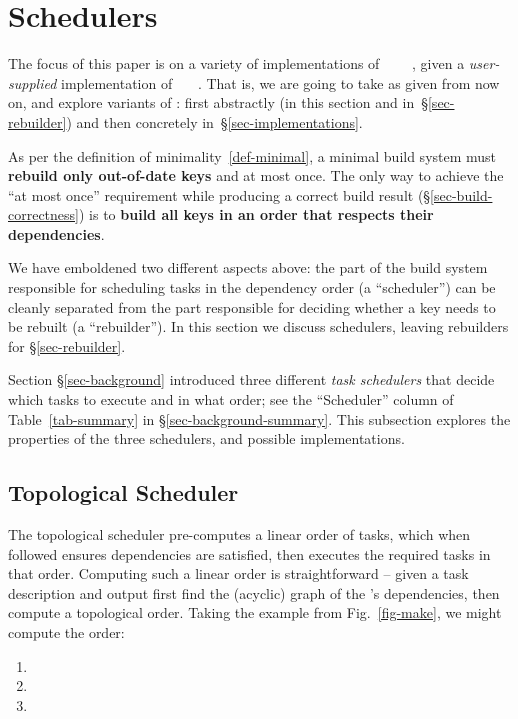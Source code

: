 \section{Schedulers}\label{sec-scheduler}

The focus of this paper is on a variety of implementations of
~~~~, given a \emph{user-supplied}
implementation of ~~~. That is, we are going to take
 as given from now on, and explore variants of : first
abstractly (in this section and in~\S\ref{sec-rebuilder}) and then concretely
in~\S\ref{sec-implementations}.

As per the definition of minimality~\ref{def-minimal}, a minimal build
system must \textbf{rebuild only out-of-date keys} and at most once. The only
way to achieve the ``at most once'' requirement while producing a correct build
result (\S\ref{sec-build-correctness}) is to \textbf{build all keys in an
order that respects their dependencies}.

We have emboldened two different aspects above: the part of the build system
responsible for scheduling tasks in the dependency order (a ``scheduler'') can
be cleanly separated from the part responsible for deciding whether a key needs
to be rebuilt (a ``rebuilder''). In this section we discuss schedulers, leaving
rebuilders for \S\ref{sec-rebuilder}.

Section \S\ref{sec-background} introduced three different \emph{task schedulers}
that decide which tasks to execute and in what order; see the ``Scheduler''
column of Table~\ref{tab-summary} in \S\ref{sec-background-summary}. This
subsection explores the properties of the three schedulers, and possible
implementations.

\subsection{Topological Scheduler}\label{sec-topological}

The topological scheduler pre-computes a linear order of tasks, which when
followed ensures dependencies are satisfied, then executes the required tasks in
that order. Computing such a linear order is straightforward -- given a task
description and output  first find the (acyclic) graph of the 's
dependencies, then compute a topological order. Taking the \Make example from
Fig.~\ref{fig-make}, we might compute the order:

\begin{enumerate}
\item {}
\item {}
\item {}
\end{enumerate}

